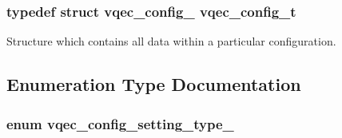 \subsubsection{\setlength{\rightskip}{0pt plus 5cm}typedef struct \bf{vqec\_\-config\_\-}  \bf{vqec\_\-config\_\-t}}\label{vqec__config__parser_8h_84110130cf16d1671648c2585419c6d0}


Structure which contains all data within a particular configuration. 

\subsection{Enumeration Type Documentation}
\subsubsection{\setlength{\rightskip}{0pt plus 5cm}enum \bf{vqec\_\-config\_\-setting\_\-type\_\-}}\label{vqec__config__parser_8h_31e73bf50471874fe12e91f9e117217a}


